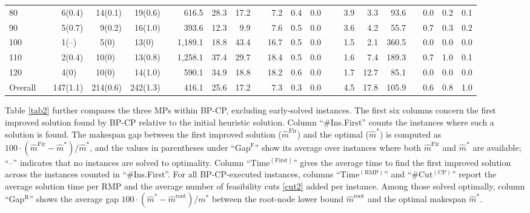\documentclass[12pt]{article}
\begin{document}
\begin{table}[htbp]
{\begin{tabular}{lrrrrrrrrrrrrrrrrrrrr}
    80    &       & 6(0.4) & 14(0.1) & 19(0.6) &       & 616.5  & 28.3  & 17.2  &       & 7.2   & 0.4   & {0.0\,\ }   &       & 3.9   & 3.3   & 93.6  &       & 0.0   & 0.2   & 0.1  \\
    90    &       & 5(0.7) & 9(0.2) & 16(1.0) &       & 393.6  & 12.3  & 9.9   &       & 7.6   & 0.5   & {0.0\,\ }   &       & 3.6   & 4.2   & 55.7  &       & 0.7   & 0.3   & 0.2  \\
    100   &       & 1{(--)}\textcolor{white}{.0}  & 5{(0)}\textcolor{white}{.0}  & 13{(0)}\textcolor{white}{.0} &       & 1,189.1  & 18.8  & 43.4  &       & 16.7  & 0.5   & {0.0\,\ }   &       & 1.5   & 2.1   & 360.5  &       & 0.0   & 0.0   & 0.0  \\
    110   &       & 2(0.4) & 10(0)\textcolor{white}{.0} & 13(0.8) &       & 1,258.1  & 37.4  & 29.7  &       & 18.4  & 0.5   & {0.0\,\ }   &       & 1.6   & 7.4   & 189.3  &       & 0.7   & 1.0   & 0.1  \\
    120   &       & 4(0)\textcolor{white}{.0}  & 10(0)\textcolor{white}{.0} & 14(1.0) &       & 590.1  & 34.9  & 18.8  &       & 18.2  & 0.6   & {0.0\,\ }   &       & 1.7   & 12.7  & 85.1  &       & 0.0   & 0.0   & 0.0  \\
\cmidrule{1-1}\cmidrule{3-5}\cmidrule{7-9}\cmidrule{11-13}\cmidrule{15-17}\cmidrule{19-21}    Overall &       & 147(1.1) & 214(0.6) & 242(1.3) &       & 416.1  & 25.6  & 17.2  &       & 7.3   & 0.3   & {0.0\,\ }   &       & 4.5   & 17.8  & 105.9  &       & 0.6   & 0.8   & 1.0  \\
    \bottomrule
    \end{tabular}
}

\end{table}

Table \ref{tab2} further compares the three MPs within BP-CP, excluding early-solved instances.  %
The first six columns concern the first improved solution found by BP-CP relative to the initial heuristic solution. Column ``\#Ins.First'' counts the instances where such a solution is found. The makespan gap between the first improved solution ($\widehat{m}^{\text{Fir}}$) and the optimal ($\widehat{m}^{*}$) is computed as $100\cdot (\widehat{m}^{\text{Fir}}-\widehat{m}^{*})/\widehat{m}^{*}$, and the values in parentheses under ``Gap$^{\text{F}}$'' show its average over instances where both $\widehat{m}^{\text{Fir}}$ and $\widehat{m}^{*}$ are available; ``--'' indicates that no instances are solved to optimality. Column ``Time$^{(\text{First})}$'' gives the average time to find the first improved solution across the instances counted in ``\#Ins.First''. For all BP-CP-executed instances, columns ``Time$^{(\text{RMP})}$'' and ``\#Cut$^{(\text{CP})}$'' report the average solution time per RMP and the average number of feasibility cuts \eqref{cut2} added per instance. Among those solved optimally, column ``Gap$^{\text{R}}$'' shows the average gap $100\cdot (\widehat{m}^{*}-\widehat{m}^{\text{root}})/m^{*}$ between the root-node lower bound $\widehat{m}^{\text{root}}$ and the optimal makespan $\widehat{m}^{*}$.%
\end{document}
